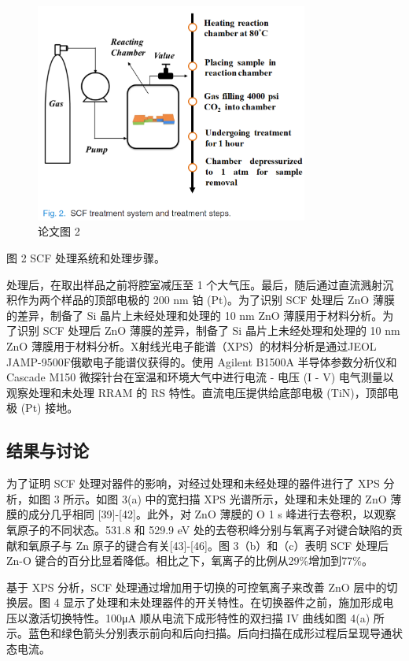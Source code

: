 \begin{figure}[htb]
\centering 
\includegraphics[width=0.80\textwidth]{img/c1m2.png} 
\caption{论文图 2}
\label{Test}
\end{figure}

图 2 SCF 处理系统和处理步骤。

处理后，在取出样品之前将腔室减压至 1 个大气压。最后，随后通过直流溅射沉积作为两个样品的顶部电极的 200 nm 铂 (Pt)。为了识别 SCF 处理后 ZnO 薄膜的差异，制备了 Si 晶片上未经处理和处理的 10 nm ZnO 薄膜用于材料分析。为了识别 SCF 处理后 ZnO 薄膜的差异，制备了 Si 晶片上未经处理和处理的 10 nm ZnO 薄膜用于材料分析。X射线光电子能谱（XPS）的材料分析是通过JEOL JAMP-9500F俄歇电子能谱仪获得的。使用 Agilent B1500A 半导体参数分析仪和 Cascade M150 微探针台在室温和环境大气中进行电流 - 电压 (I - V) 电气测量以观察处理和未处理 RRAM 的 RS 特性。直流电压提供给底部电极 (TiN)，顶部电极 (Pt) 接地。

\subsection{结果与讨论}

为了证明 SCF 处理对器件的影响，对经过处理和未经处理的器件进行了 XPS 分析，如图 3 所示。如图 3(a) 中的宽扫描 XPS 光谱所示，处理和未处理的 ZnO 薄膜的成分几乎相同 [39]-[42]。此外，对 ZnO 薄膜的 O 1 s 峰进行去卷积，以观察氧原子的不同状态。531.8 和 529.9 eV 处的去卷积峰分别与氧离子对键合缺陷的贡献和氧原子与 Zn 原子的键合有关[43]-[46]。图 3（b）和（c）表明 SCF 处理后 Zn-O 键合的百分比显着降低。相比之下，氧离子的比例从29\%增加到77\%。

基于 XPS 分析，SCF 处理通过增加用于切换的可控氧离子来改善 ZnO 层中的切换层。图 4 显示了处理和未处理器件的开关特性。在切换器件之前，施加形成电压以激活切换特性。100μA 顺从电流下成形特性的双扫描 IV 曲线如图 4(a) 所示。蓝色和绿色箭头分别表示前向和后向扫描。后向扫描在成形过程后呈现导通状态电流。

